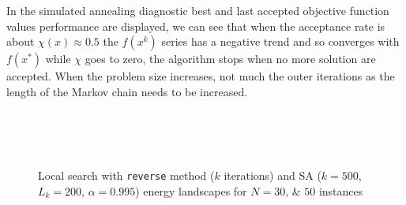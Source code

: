In the simulated annealing diagnostic best and last accepted objective function values performance are displayed, we can see that when the acceptance rate is about $\chi(x)\approx0.5$ the $f(x^k)$ series has a negative trend and so converges with $f(x^\ast)$ while $\chi$ goes to zero, the algorithm stops when no more solution are accepted. When the problem size increases, not much the outer iterations as the length of the Markov chain needs to be increased.


\begin{figure}
\centering
{} \,
 \\
 \,
 \\
 \,
\caption{Local search with \texttt{reverse} method ($k$ iterations) and SA ($k=500$, $L_k=200$, $\alpha=0.995$) energy landscapes for $N=\numlist{30;50}$ instances}
\label{fig:res-energy}
\end{figure}


